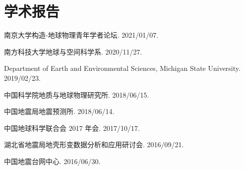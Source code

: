 \section*{学术报告}

\begin{etaremune}
\item
	南京大学构造-地球物理青年学者论坛.
	2021/01/07.
\item
	南方科技大学地球与空间科学系.
	2020/11/27.
	\invited
\item
    Department of Earth and Environmental Sciences, Michigan State University.
    2019/02/23.
\item
	中国科学院地质与地球物理研究所.
	2018/06/15.
	\invited
\item
	中国地震局地震预测所.
	2018/06/14.
\item
	中国地球科学联合会 2017 年会.
	2017/10/17.
	\invited
\item
	湖北省地震局地壳形变数据分析和应用研讨会.
	2016/09/21.
	\invited
\item
	中国地震台网中心.
	2016/06/30.
	\invited
\end{etaremune}
